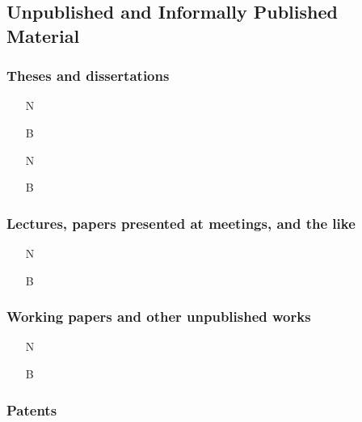 \documentclass[11pt,letterpaper,oneside]{article}
\begin{document}
\setcounter{subsection}{2}
\subsection{Unpublished and Informally Published Material}
\setcounter{subsection}{14}

\setcounter{subsubsection}{223}
\subsubsection{Theses and dissertations}

\begin{itemize}
\item[N] 

\item[B] 

\item[N] 

\item[B] 
\end{itemize}

\setcounter{subsubsection}{225}
\subsubsection{Lectures, papers presented at meetings, and the like}

\begin{itemize}
\item[N] 

\item[B] 
\end{itemize}

\setcounter{subsubsection}{227}
\subsubsection{Working papers and other unpublished works}

\begin{itemize}
\item[N] 

\item[B] 
\end{itemize}

\setcounter{subsubsection}{229}
\subsubsection{Patents}
\end{document}

